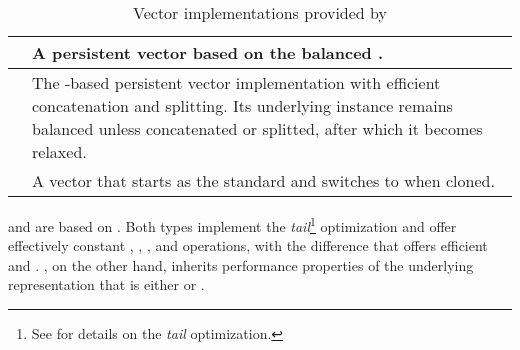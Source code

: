 \begin{table}[!ht]

    \centering
    \begin{tabular} { |p{18mm}|p{112mm}| }
        \hline
        \rbvec{} & A persistent vector based on the balanced \rrbtree{}. \\ \hline
        \rrbvec{} & The \rrbtree{}-based persistent vector implementation with efficient concatenation and splitting. Its underlying \rrbtree{} instance remains balanced unless concatenated or splitted, after which it becomes relaxed. \\ \hline
        \pvec{} & A vector that starts as the standard and switches to \rrbvec{} when cloned. \\ \hline
    \end{tabular}

    \label{tab:vec-implementations}
    \caption{Vector implementations provided by \pvecrs{}}
\end{table}

\rbvec{} and \rrbvec{} are based on \rrbtree{}. Both types implement the \emph{tail}\footnote{See  for details on the \emph{tail} optimization.} optimization and offer effectively constant , , , and  operations, with the difference that \rrbvec{} offers efficient  and . \pvec{}, on the other hand, inherits performance properties of the underlying representation that is either \stdvec{} or \rrbvec{}.

